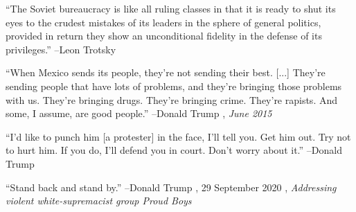 \documentclass{article}%
\begin{document}
\linebreak%
\vspace{1mm}%
\begin{minipage}{\textwidth}%
\flushleft%
“The Soviet bureaucracy is like all ruling classes in that it is ready to shut its eyes to the crudest mistakes of its leaders in the sphere of general politics, provided in return they show an unconditional fidelity in the defense of its privileges.”%
\linebreak%
\vspace{1mm}%
–Leon Trotsky%
\linebreak%
\vspace{1mm}%
\end{minipage}%
\linebreak%
\vspace{1mm}%
\begin{minipage}{\textwidth}%
\flushleft%
“When Mexico sends its people, they're not sending their best. {[}...{]} They're sending people that have lots of problems, and they're bringing those problems with us. They're bringing drugs. They're bringing crime. They're rapists. And some, I assume, are good people.”%
\linebreak%
\vspace{1mm}%
–Donald Trump%
, \textit{June 2015}%
\linebreak%
\vspace{1mm}%
\end{minipage}%
\linebreak%
\vspace{1mm}%
\begin{minipage}{\textwidth}%
\flushleft%
“I'd like to punch him {[}a protester{]} in the face, I'll tell you. Get him out. Try not to hurt him. If you do, I'll defend you in court. Don't worry about it.”%
\linebreak%
\vspace{1mm}%
–Donald Trump%
\linebreak%
\vspace{1mm}%
\end{minipage}%
\linebreak%
\vspace{1mm}%
\begin{minipage}{\textwidth}%
\flushleft%
“Stand back and stand by.”%
\linebreak%
\vspace{1mm}%
–Donald Trump%
, 29 September 2020%
, \textit{Addressing violent white-supremacist group Proud Boys}%
\linebreak%
\vspace{1mm}%
\end{minipage}%
\end{document}
